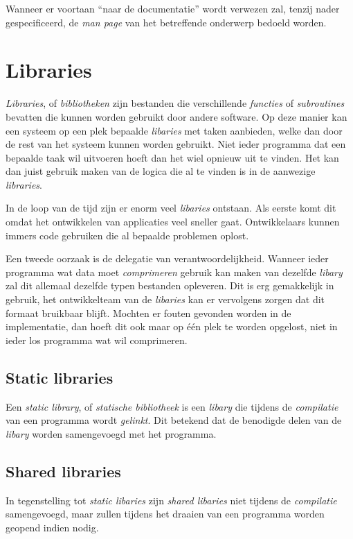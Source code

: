 Wanneer er voortaan ``naar de documentatie'' wordt verwezen zal, tenzij nader gespecificeerd, de \emph{man page} van het betreffende onderwerp bedoeld worden. 

\section{Libraries}
\emph{Libraries}, of \emph{bibliotheken} zijn bestanden die verschillende \emph{functies} of \emph{subroutines} bevatten die kunnen worden gebruikt door andere software. Op deze manier kan een systeem op een plek bepaalde \emph{libaries} met taken aanbieden, welke dan door de rest van het systeem kunnen worden gebruikt. Niet ieder programma dat een bepaalde taak wil uitvoeren hoeft dan het wiel opnieuw uit te vinden. Het kan dan juist gebruik maken van de logica die al te vinden is in de aanwezige \emph{libraries}. 

In de loop van de tijd zijn er enorm veel \emph{libaries} ontstaan. Als eerste komt dit omdat het ontwikkelen van applicaties veel sneller gaat. Ontwikkelaars kunnen immers code gebruiken die al bepaalde problemen oplost. 

Een tweede oorzaak is de delegatie van verantwoordelijkheid. Wanneer ieder programma wat data moet \emph{comprimeren} gebruik kan maken van dezelfde \emph{libary} zal dit allemaal dezelfde typen bestanden opleveren. Dit is erg gemakkelijk in gebruik, het ontwikkelteam van de \emph{libaries} kan er vervolgens zorgen dat dit formaat bruikbaar blijft. Mochten er fouten gevonden worden in de implementatie, dan hoeft dit ook maar op \'{e}\'{e}n plek te worden opgelost, niet in ieder los programma wat wil comprimeren. 

\subsection{Static libraries}
Een \emph{static library}, of \emph{statische bibliotheek} is een \emph{libary} die tijdens de \emph{compilatie} van een programma wordt \emph{gelinkt}. Dit betekend dat de benodigde delen van de \emph{libary} worden samengevoegd met het programma. 

\subsection{Shared libraries}
In tegenstelling tot \emph{static libaries} zijn \emph{shared libaries} niet tijdens de \emph{compilatie} samengevoegd, maar zullen tijdens het draaien van een programma worden geopend indien nodig. 

